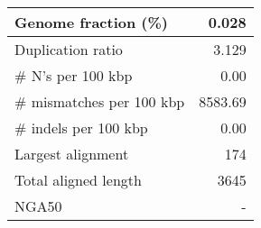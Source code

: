 \documentclass[12pt,a4paper]{article}
\begin{document}
\begin{table}[ht]
\begin{center}
\begin{tabular}{|l*{1}{|r}|}
Genome fraction (\%) & 0.028 \\ \hline
Duplication ratio & 3.129 \\ \hline
\# N's per 100 kbp & 0.00 \\ \hline
\# mismatches per 100 kbp & 8583.69 \\ \hline
\# indels per 100 kbp & 0.00 \\ \hline
Largest alignment & 174 \\ \hline
Total aligned length & 3645 \\ \hline
NGA50 & - \\ \hline
\end{tabular}
\end{center}
\end{table}
\end{document}
